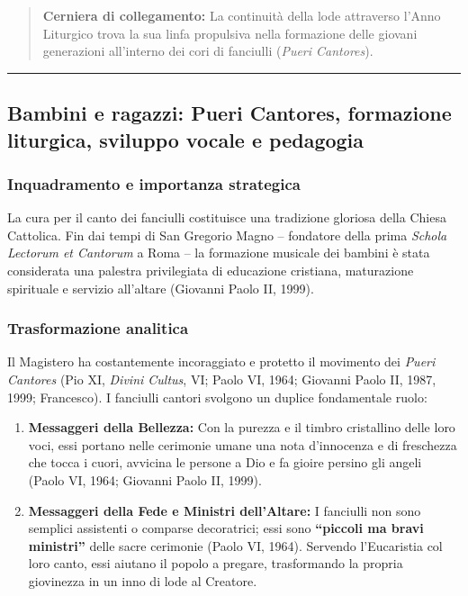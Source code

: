 \documentclass[12pt,a4paper]{article}
\begin{document}
	\begin{quote}
		\textbf{Cerniera di collegamento:} La continuità della lode attraverso l'Anno Liturgico trova la sua linfa propulsiva nella formazione delle giovani generazioni all'interno dei cori di fanciulli (\emph{Pueri Cantores}).
	\end{quote}
	
	\begin{center}\rule{0.5\linewidth}{0.5pt}\end{center}
	
	\subsection{Bambini e ragazzi: Pueri Cantores, formazione liturgica, sviluppo vocale e pedagogia}\label{bambini-e-ragazzi-pueri-cantores-formazione-liturgica-sviluppo-vocale-e-pedagogia}
	
	\subsubsection{Inquadramento e importanza strategica}\label{inquadramento-e-importanza-strategica-10}
	
	La cura per il canto dei fanciulli costituisce una tradizione gloriosa della Chiesa Cattolica. Fin dai tempi di San Gregorio Magno -- fondatore della prima \emph{Schola Lectorum et Cantorum} a Roma -- la formazione musicale dei bambini è stata considerata una palestra privilegiata di educazione cristiana, maturazione spirituale e servizio all'altare (Giovanni Paolo II, 1999).
	
	\subsubsection{Trasformazione analitica}\label{trasformazione-analitica-11}
	
	Il Magistero ha costantemente incoraggiato e protetto il movimento dei \emph{Pueri Cantores} (Pio XI, \emph{Divini Cultus}, VI; Paolo VI, 1964; Giovanni Paolo II, 1987, 1999; Francesco). I fanciulli cantori svolgono un duplice fondamentale ruolo:
	
	\begin{enumerate}[label=\arabic*.,leftmargin=*]
		\item \textbf{Messaggeri della Bellezza:} Con la purezza e il timbro cristallino delle loro voci, essi portano nelle cerimonie umane una nota d'innocenza e di freschezza che tocca i cuori, avvicina le persone a Dio e fa gioire persino gli angeli (Paolo VI, 1964; Giovanni Paolo II, 1999).
		\item \textbf{Messaggeri della Fede e Ministri dell'Altare:} I fanciulli non sono semplici assistenti o comparse decoratrici; essi sono \textbf{``piccoli ma bravi ministri''} delle sacre cerimonie (Paolo VI, 1964). Servendo l'Eucaristia col loro canto, essi aiutano il popolo a pregare, trasformando la propria giovinezza in un inno di lode al Creatore.
	\end{enumerate}
	
\end{document}
